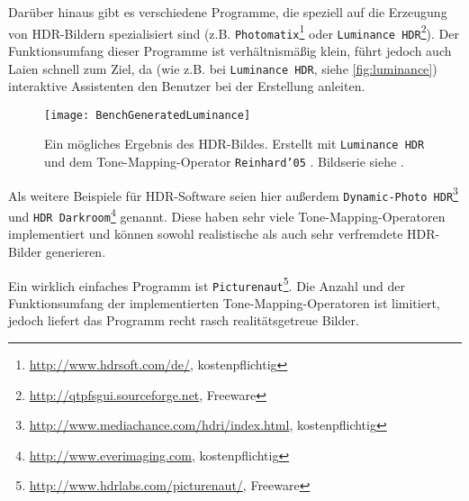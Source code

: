 Darüber hinaus gibt es verschiedene Programme, die speziell auf die Erzeugung von \gls{HDR}-Bildern spezialisiert sind (z.B. \texttt{Photomatix}\footnote{\url{http://www.hdrsoft.com/de/}, kostenpflichtig} oder \texttt{Luminance HDR}\footnote{\url{http://qtpfsgui.sourceforge.net}, Freeware}). Der Funktionsumfang dieser Programme ist verhältnismäßig klein, führt jedoch auch Laien schnell zum Ziel, da (wie z.B. bei \texttt{Luminance HDR}, siehe \autoref{fig:luminance}) interaktive Assistenten den Benutzer bei der Erstellung anleiten. 


\begin{figure}
  \begin{center}
    \texttt{[image: BenchGeneratedLuminance]}
    \caption{Ein mögliches Ergebnis des \gls{HDR}-Bildes. Erstellt mit \texttt{Luminance HDR} und dem \gls{Tone-Mapping}-Operator \texttt{Reinhard'05} \cite{Reinhard05}. Bildserie siehe \cite{tellone}.}
    \label{fig:luminance}
  \end{center}
\end{figure}

Als weitere Beispiele für HDR-Software seien hier außerdem \texttt{Dynamic-Photo HDR}\footnote{\url{http://www.mediachance.com/hdri/index.html}, kostenpflichtig} und \texttt{HDR Darkroom}\footnote{\url{http://www.everimaging.com}, kostenpflichtig} genannt. Diese haben sehr viele \gls{Tone-Mapping}-Operatoren implementiert und können sowohl realistische als auch sehr verfremdete \gls{HDR}-Bilder generieren. 

Ein wirklich einfaches Programm ist \texttt{Picturenaut}\footnote{\url{http://www.hdrlabs.com/picturenaut/}, Freeware}. Die Anzahl und der Funktionsumfang der implementierten \gls{Tone-Mapping}-Operatoren ist limitiert, jedoch liefert das Programm recht rasch realitätsgetreue Bilder.


